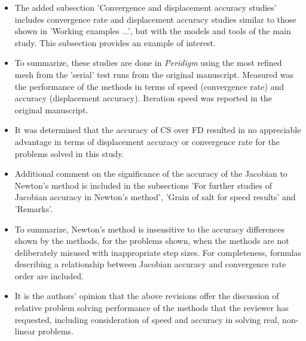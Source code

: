 \documentclass{article}
\begin{document}
\begin{enumerate}
{\color{red}
  \begin{itemize}
    \item 
      The added subsection 'Convergence and displacement accuracy studies'
      includes convergence rate and displacement accuracy studies similar to
      those shown in 'Working examples ...', but with the models and tools of
      the main study. This subsection provides an example of interest. 
  \item 
      To summarize, these studies are done in \emph{Peridigm} using the most refined mesh
      from the 'serial' test runs from the original manuscript. Measured was the performance of the methods in terms of speed
      (convergence rate) and accuracy (displacement accuracy).  Iteration speed
      was reported in the original manuscript.
  \item
      It was determined that the accuracy of CS over FD resulted in no appreciable
      advantage in terms of displacement accuracy or convergence rate for the problems
      solved in this study. 
    \item
      Additional comment on the significance of the accuracy of the Jacobian
      to Newton's method is included in the subsections 'For further studies of
      Jacobian accuracy in Newton's method', 'Grain of salt for speed results'
      and 'Remarks'. 
  \item 
      To summarize, Newton's method is insensitive to the accuracy differences
      shown by the methods, for the problems shown, when the methods are not
      deliberately misused with inappropriate step sizes. For completeness,
      formulas describing a relationship between Jacobian accuracy and
      convergence rate order are included. 
  \item
      It is the authors' opinion that the above revisions offer the discussion of relative problem solving
      performance of the methods that the reviewer has requested, including consideration
      of speed and accuracy in solving real, non-linear problems.
  \end{itemize}}
  \end{enumerate}
\end{document}
